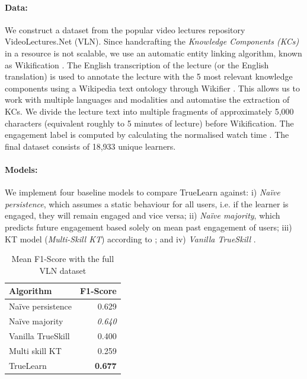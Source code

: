 \documentclass[letterpaper]{article} %
\begin{document}
\paragraph{Data:} We construct a dataset from the popular video lectures repository VideoLectures.Net (VLN). Since handcrafting the \emph{Knowledge Components (KCs)} in a resource is not scalable, we use an automatic entity linking algorithm, known as Wikification \cite{wikifier}.  The English transcription of the lecture (or the English translation) is used to annotate the lecture with the 5 most relevant knowledge components using a Wikipedia text ontology through Wikifier \cite{wikifier}. This allows us to work with multiple languages and modalities and automatise the extraction of KCs. We divide the lecture text into multiple fragments of approximately 5,000 characters (equivalent roughly to 5 minutes of lecture) before Wikification. The engagement label is computed by calculating the normalised watch time \cite{Guo_vid_prod}. The final dataset consists of 18,933 unique learners.


\paragraph{Models:} We implement four baseline models to compare TrueLearn against: i) \emph{Na\"ive persistence}, which assumes a static behaviour for all users, i.e. if the learner is engaged, they will remain engaged and vice versa; ii) \emph{Na\"ive majority}, which predicts future engagement based solely on mean past engagement of users; iii) KT model (\emph{Multi-Skill KT}) according to \cite{bishopsnewbook}; and iv) \emph{Vanilla TrueSkill} \cite{trueskill}.%



\begin{table}[!h]
  \caption{Mean F1-Score with the full VLN dataset}
  \label{tab:truelearn_performance}
  \centering
  \begin{tabular}{l r}  \toprule
    Algorithm 
    & F1-Score \\  \hline
   
    Na\"ive persistence 
    & 0.629 \\
    Na\"ive majority 
    & \textit{0.640} \\
    Vanilla TrueSkill
    & 0.400 \\
    Multi skill KT 
    & 0.259 \\
    TrueLearn 
    & \textbf{0.677} \\  
    \hline
  \end{tabular}
\end{table}
\end{document}
